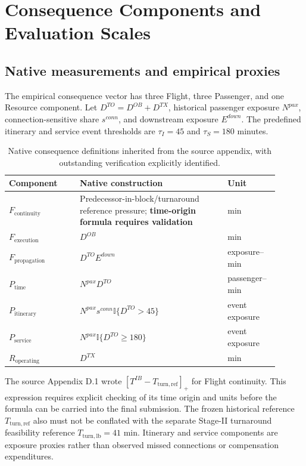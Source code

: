 \documentclass[10pt,a4paper]{article}
\newcommand{\ind}{\mathbb I}
\numberwithin{equation}{section}
\begin{document}
\section{Consequence Components and Evaluation Scales}
\label{sup:consequence}
\subsection{Native measurements and empirical proxies}
The empirical consequence vector has three Flight, three Passenger, and one Resource component. Let $D^{TO}=D^{OB}+D^{TX}$, historical passenger exposure $N^{pax}$, connection-sensitive share $s^{conn}$, and downstream exposure $E^{down}$. The predefined itinerary and service event thresholds are $\tau_I=45$ and $\tau_S=180$ minutes.

\begin{table}[htbp]\centering\footnotesize
\caption{Native consequence definitions inherited from the source appendix, with outstanding verification explicitly identified.}\label{tab:sup_consequences}
\begin{tabular}{p{0.24\linewidth}p{0.50\linewidth}p{0.16\linewidth}}\toprule
Component & Native construction & Unit\\\midrule
$F_{\mathrm{continuity}}$ & Predecessor-in-block/turnaround reference pressure; \textbf{time-origin formula requires validation} & min\\
$F_{\mathrm{execution}}$ & $D^{OB}$ & min\\
$F_{\mathrm{propagation}}$ & $D^{TO} E^{down}$ & exposure--min\\
$P_{\mathrm{time}}$ & $N^{pax} D^{TO}$ & passenger--min\\
$P_{\mathrm{itinerary}}$ & $N^{pax}s^{conn}\ind\{D^{TO}>45\}$ & event exposure\\
$P_{\mathrm{service}}$ & $N^{pax}\ind\{D^{TO}\ge 180\}$ & event exposure\\
$R_{\mathrm{operating}}$ & $D^{TX}$ & min\\
\bottomrule\end{tabular}\end{table}
The source Appendix D.1 wrote $[T^{IB}-T_{\mathrm{turn,ref}}]_+$ for Flight continuity. This expression requires explicit checking of its time origin and units before the formula can be carried into the final submission. The frozen historical reference $T_{\mathrm{turn,ref}}$ also must not be conflated with the separate Stage-II turnaround feasibility reference $T_{\mathrm{turn,lb}}=41$ min. Itinerary and service components are exposure proxies rather than observed missed connections or compensation expenditures.
\end{document}
